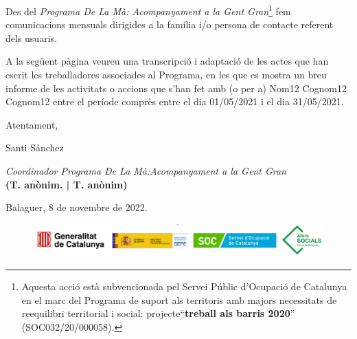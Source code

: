 \documentclass[a4paper,12pt]{elsarticle}  %
\begin{document}
Des del \textit{Programa De La Mà: Acompanyament a la Gent Gran}\footnote{Aquesta acció està subvencionada pel Servei Públic 
d'Ocupació de Catalunya en el marc del Programa de suport als territoris amb majors 
necessitats de reequilibri territorial i social: projecte``\textbf{treball als barris 2020}'' (SOC032/20/000058).} fem comunicacions mensuals
dirigides a la família i/o persona de contacte referent dels usuaris.


A la següent pàgina veureu una transcripció i adaptació de les actes que han escrit les treballadores associades
al Programa, en les que es mostra un breu informe de les activitats o accions que s'han fet amb (o per a) 
Nom12 Cognom12 Cognom12 entre el període comprès entre el dia 01/05/2021 i el dia 31/05/2021.

	\vspace{0.5cm}

\noindent Atentament,

\noindent Santi Sánchez

\noindent \textit{Coordinador Programa De La Mà:Acompanyament a la Gent Gran}\\
\textbf{(T. anònim. | T. anònim)}

	\vspace{0.5cm}

\noindent Balaguer, 8 de novembre de 2022.

	









\vfill

\FloatBarrier
\begin{figure}[h]
	\centering	
	\includegraphics[width=1\textwidth]{../IMATGES/logosGeneMinisterAferssocialsSoc.png}	
\end{figure}
\FloatBarrier	










\clearpage
\end{document}
